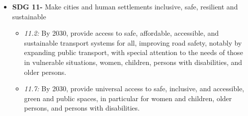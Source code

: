 \begin{itemize}[leftmargin=*, itemsep=1pt, parsep=1pt]
\begin{itemize}[leftmargin=*, itemsep=1pt, parsep=1pt]
            \item {\it 10.3:} Ensure equal opportunity and reduce inequalities of outcome, including by eliminating discriminatory laws, policies, and practices and promoting appropriate legislation, policies, and action in this regard.
        \end{itemize}
    \item {\bf SDG 11-} Make cities and human settlements inclusive, safe, resilient and sustainable
        \begin{itemize}[leftmargin=*, itemsep=1pt, parsep=1pt]
            \item {\it 11.2:} By 2030, provide access to safe, affordable, accessible, and sustainable transport systems for all, improving road safety, notably by expanding public transport, with special attention to the needs of those in vulnerable situations, women, children, persons with disabilities, and older persons.
            \item {\it 11.7:} By 2030, provide universal access to safe, inclusive, and accessible, green and public spaces, in particular for women and children, older persons, and persons with disabilities.
        \end{itemize}
\end{itemize}


